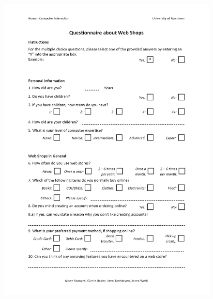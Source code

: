 \begin{figure}[H]
\begin{center}
\includegraphics[scale=0.75]{User_Involvement_Methods/Questionnaires/Questionnaire_Web_Shops_v2_1.png}
\end{center}
\end{figure}
\newpage

